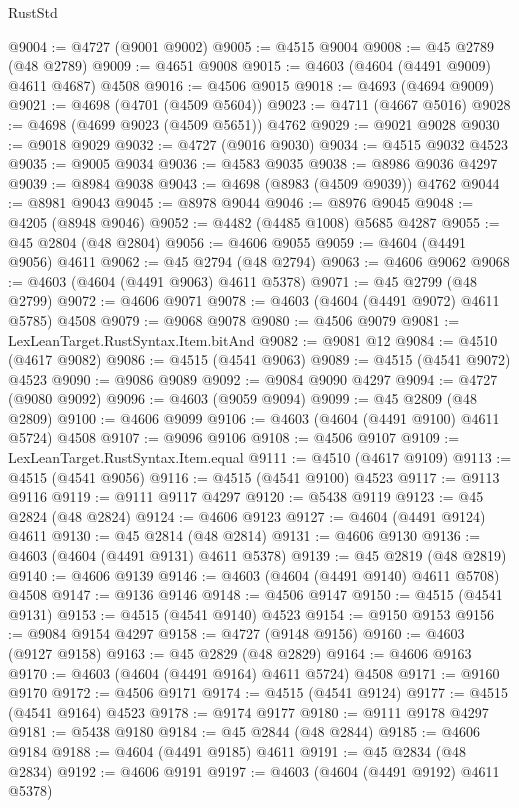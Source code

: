 \begin{lexlean}{RustStd}
\begin{coremodule}
@9004 := @4727 (@9001 @9002)
@9005 := @4515 @9004
@9008 := @45 @2789 (@48 @2789)
@9009 := @4651 @9008
@9015 := @4603 (@4604 (@4491 @9009) @4611 @4687) @4508
@9016 := @4506 @9015
@9018 := @4693 (@4694 @9009)
@9021 := @4698 (@4701 (@4509 @5604))
@9023 := @4711 (@4667 @5016)
@9028 := @4698 (@4699 @9023 (@4509 @5651)) @4762
@9029 := @9021 @9028
@9030 := @9018 @9029
@9032 := @4727 (@9016 @9030)
@9034 := @4515 @9032 @4523
@9035 := @9005 @9034
@9036 := @4583 @9035
@9038 := @8986 @9036 @4297
@9039 := @8984 @9038
@9043 := @4698 (@8983 (@4509 @9039)) @4762
@9044 := @8981 @9043
@9045 := @8978 @9044
@9046 := @8976 @9045
@9048 := @4205 (@8948 @9046)
@9052 := @4482 (@4485 @1008) @5685 @4287
@9055 := @45 @2804 (@48 @2804)
@9056 := @4606 @9055
@9059 := @4604 (@4491 @9056) @4611
@9062 := @45 @2794 (@48 @2794)
@9063 := @4606 @9062
@9068 := @4603 (@4604 (@4491 @9063) @4611 @5378)
@9071 := @45 @2799 (@48 @2799)
@9072 := @4606 @9071
@9078 := @4603 (@4604 (@4491 @9072) @4611 @5785) @4508
@9079 := @9068 @9078
@9080 := @4506 @9079
@9081 := LexLeanTarget.RustSyntax.Item.bitAnd
@9082 := @9081 @12
@9084 := @4510 (@4617 @9082)
@9086 := @4515 (@4541 @9063)
@9089 := @4515 (@4541 @9072) @4523
@9090 := @9086 @9089
@9092 := @9084 @9090 @4297
@9094 := @4727 (@9080 @9092)
@9096 := @4603 (@9059 @9094)
@9099 := @45 @2809 (@48 @2809)
@9100 := @4606 @9099
@9106 := @4603 (@4604 (@4491 @9100) @4611 @5724) @4508
@9107 := @9096 @9106
@9108 := @4506 @9107
@9109 := LexLeanTarget.RustSyntax.Item.equal
@9111 := @4510 (@4617 @9109)
@9113 := @4515 (@4541 @9056)
@9116 := @4515 (@4541 @9100) @4523
@9117 := @9113 @9116
@9119 := @9111 @9117 @4297
@9120 := @5438 @9119
@9123 := @45 @2824 (@48 @2824)
@9124 := @4606 @9123
@9127 := @4604 (@4491 @9124) @4611
@9130 := @45 @2814 (@48 @2814)
@9131 := @4606 @9130
@9136 := @4603 (@4604 (@4491 @9131) @4611 @5378)
@9139 := @45 @2819 (@48 @2819)
@9140 := @4606 @9139
@9146 := @4603 (@4604 (@4491 @9140) @4611 @5708) @4508
@9147 := @9136 @9146
@9148 := @4506 @9147
@9150 := @4515 (@4541 @9131)
@9153 := @4515 (@4541 @9140) @4523
@9154 := @9150 @9153
@9156 := @9084 @9154 @4297
@9158 := @4727 (@9148 @9156)
@9160 := @4603 (@9127 @9158)
@9163 := @45 @2829 (@48 @2829)
@9164 := @4606 @9163
@9170 := @4603 (@4604 (@4491 @9164) @4611 @5724) @4508
@9171 := @9160 @9170
@9172 := @4506 @9171
@9174 := @4515 (@4541 @9124)
@9177 := @4515 (@4541 @9164) @4523
@9178 := @9174 @9177
@9180 := @9111 @9178 @4297
@9181 := @5438 @9180
@9184 := @45 @2844 (@48 @2844)
@9185 := @4606 @9184
@9188 := @4604 (@4491 @9185) @4611
@9191 := @45 @2834 (@48 @2834)
@9192 := @4606 @9191
@9197 := @4603 (@4604 (@4491 @9192) @4611 @5378)

\end{coremodule}
\end{lexlean}
